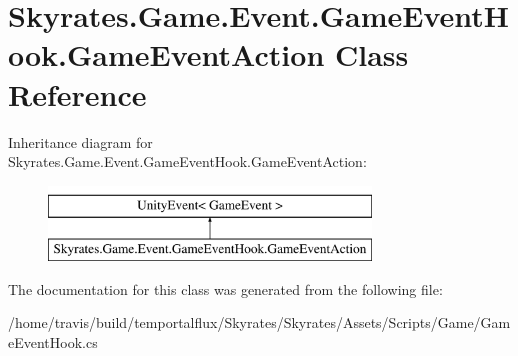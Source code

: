 \hypertarget{class_skyrates_1_1_game_1_1_event_1_1_game_event_hook_1_1_game_event_action}{\section{Skyrates.\-Game.\-Event.\-Game\-Event\-Hook.\-Game\-Event\-Action Class Reference}
\label{class_skyrates_1_1_game_1_1_event_1_1_game_event_hook_1_1_game_event_action}
}
Inheritance diagram for Skyrates.\-Game.\-Event.\-Game\-Event\-Hook.\-Game\-Event\-Action\-:\begin{figure}[H]
\begin{center}
\leavevmode
\includegraphics[height=2.000000cm]{class_skyrates_1_1_game_1_1_event_1_1_game_event_hook_1_1_game_event_action}
\end{center}
\end{figure}


The documentation for this class was generated from the following file\-:\begin{DoxyCompactItemize}
\item 
/home/travis/build/temportalflux/\-Skyrates/\-Skyrates/\-Assets/\-Scripts/\-Game/Game\-Event\-Hook.\-cs\end{DoxyCompactItemize}
